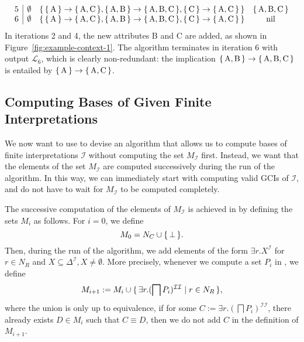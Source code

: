 \begin{Example}
\begin{equation*}
\begin{array}{c|ccc}
      5 & \emptyset      & \set{\set{\text{A}} \to \set{\text{A},\text{C}},
        \set{\text{A},\text{B}} \to \set{\text{A}, \text{B}, \text{C}}, \set{\text{C}} \to
        \set{\text{A},\text{C}}} & \set{\text{A}, \text{B}, \text{C}}\\
      6 & \emptyset & \set{\set{\text{A}} \to \set{\text{A},\text{C}},
        \set{\text{A},\text{B}} \to \set{\text{A}, \text{B}, \text{C}}, \set{\text{C}} \to
        \set{\text{A},\text{C}}} & \text{\lstinline{nil}}
    \end{array}
  \end{equation*}
  In iterations 2 and 4, the new attributes B and C are added, as shown in
  Figure~\ref{fig:example-context-1}.  The algorithm terminates in iteration 6 with output
  $\mathcal{L}_6$, which is clearly non-redundant: the implication ${\{\,\text{A},
    \text{B}\,\}} \to {\ensuremath{\{\,\text{A}, \text{B}, \text{C}\,\}}}$ is entailed by ${\{\,\text{A}\,\}} \to
  {\ensuremath{\{\,\text{A}, \text{C}\,\}}}$.
\end{Example}

\subsection{Computing Bases of Given Finite Interpretations}
\label{sec:comp-bases-given}

We now want to use  to devise an algorithm that
allows us to compute bases of finite interpretations $\mathcal{I}$ without computing the
set $M_{\mathcal{I}}$ first.  Instead, we want that the elements of the set
$M_{\mathcal{I}}$ are computed successively during the run of the algorithm.  In this way,
we can immediately start with computing valid GCIs of $\mathcal{I}$, and do not have to
wait for $M_{\mathcal{I}}$ to be computed completely.

The successive computation of the elements of $M_{\mathcal{I}}$ is achieved in
 by defining the sets $M_{i}$ as follows.  For $i
= 0$, we define
\begin{equation*}
  M_{0} = N_{C} \cup {\ensuremath{\{\, \bot \,\}}}.
\end{equation*}
Then, during the run of the algorithm, we add elements of the form $\exists
r. X^{\mathcal{I}}$ for $r \in N_{R}$ and $X \subseteq \Delta^{\mathcal{I}}, X \neq
\emptyset$.  More precisely, whenever we compute a set $P_{i}$ in
, we define
\begin{equation*}
  M_{i+1} := M_{i} \cup {\ensuremath{\{\, \exists r. (\bigsqcap P_{i})^{\mathcal{I}\mathcal{I}} \mid r
    \in N_{R} \,\}}},
\end{equation*}
where the union is only up to equivalence, \ie if for some $C:= \exists r. (\bigsqcap
P_{i})^{\mathcal{I}\mathcal{I}}$, there already exists $D \in M_{i}$ such that $C \equiv
D$, then we do not add $C$ in the definition of $M_{i+1}$.

